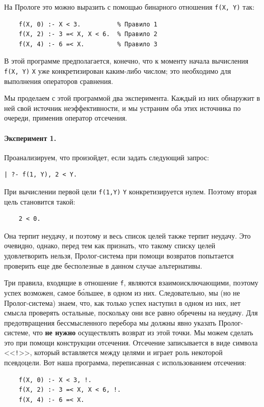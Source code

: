 \documentclass[12pt, openany, twoside]{book} %
\begin{document}
\noindent На Прологе это можно выразить с помощью бинарного отношения
\texttt{f(X, Y)} так:
{\tt \begin{verbatim}
    f(X, 0) :- X < 3.          % Правило 1
    f(X, 2) :- 3 =< X, X < 6.  % Правило 2
    f(X, 4) :- 6 =< X.         % Правило 3
\end{verbatim}}

В этой программе предполагается, конечно, что к моменту начала вычисления {\tt f(X, Y)} {\tt X} уже конкретизирован каким-либо числом; это необходимо для выполнения операторов сравнения.

Мы проделаем с этой программой два эксперимента. Каждый из них обнаружит в ней свой источник неэффективности, и мы устраним оба этих источника по очереди, применив оператор отсечения.

\paragraph{Эксперимент 1.} Проанализируем, что произойдет, если задать следующий запрос:
{\tt \begin{verbatim}
| ?- f(1, Y), 2 < Y.
\end{verbatim}}

При вычислении первой цели {\tt f(1,Y)} {\tt Y} конкретизируется нулем. Поэтому вторая цель становится такой:
{\tt \begin{verbatim}
    2 < 0.
\end{verbatim}}
\noindent Она терпит неудачу, и поэтому и весь список целей также терпит неудачу. Это очевидно, однако, перед тем как признать, что такому списку целей удовлетворить нельзя, Пролог-система при помощи возвратов попытается проверить еще две бесполезные в данном случае альтернативы.

Три правила, входящие в отношение {\tt f}, являются взаимоисключающими, поэтому успех возможен, самое б\'{о}льшее, в одном из них. Следовательно, мы (но не Пролог-система) знаем, что, как только успех наступил в одном из них, нет смысла проверять остальные, поскольку они все равно обречены на неудачу. Для предотвращения бессмысленного перебора мы должны явно указать Пролог-системе, что {\bf не нужно} осуществлять возврат из этой точки. Мы можем сделать это при помощи конструкции отсечения. Отсечение записывается в виде символа <<{\tt !}>>, который вставляется между целями и играет роль некоторой псевдоцели. Вот наша программа, переписанная с использованием отсечения:

{\tt \begin{verbatim}
    f(X, 0) :- X < 3, !.
    f(X, 2) :- 3 =< X, X < 6, !.
    f(X, 4) :- 6 =< X.
\end{verbatim}}
\end{document}
